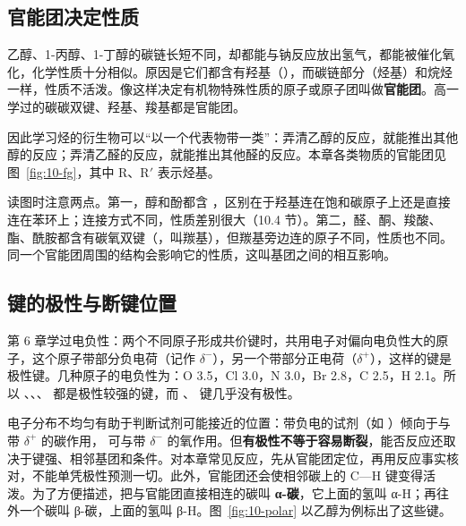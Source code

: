 \subsection{官能团决定性质}
乙醇、1-丙醇、1-丁醇的碳链长短不同，却都能与钠反应放出氢气，都能被催化氧化，化学性质十分相似。原因是它们都含有羟基（），而碳链部分（烃基）和烷烃一样，性质不活泼。像这样决定有机物特殊性质的原子或原子团叫做\textbf{官能团}。高一学过的碳碳双键、羟基、羧基都是官能团。

因此学习烃的衍生物可以“以一个代表物带一类”：弄清乙醇的反应，就能推出其他醇的反应；弄清乙醛的反应，就能推出其他醛的反应。本章各类物质的官能团见图~\ref{fig:10-fg}，其中 R、R$'$ 表示烃基。


读图时注意两点。第一，醇和酚都含 ，区别在于羟基连在饱和碳原子上还是直接连在苯环上；连接方式不同，性质差别很大（10.4 节）。第二，醛、酮、羧酸、酯、酰胺都含有碳氧双键（，叫羰基），但羰基旁边连的原子不同，性质也不同。同一个官能团周围的结构会影响它的性质，这叫基团之间的相互影响。

\subsection{键的极性与断键位置}
第 6 章学过电负性：两个不同原子形成共价键时，共用电子对偏向电负性大的原子，这个原子带部分负电荷（记作 $\delta^-$），另一个带部分正电荷（$\delta^+$），这样的键是极性键。几种原子的电负性为：O 3.5，Cl 3.0，N 3.0，Br 2.8，C 2.5，H 2.1。所以 、、、 都是极性较强的键，而 、 键几乎没有极性。

电子分布不均匀有助于判断试剂可能接近的位置：带负电的试剂（如 ）倾向于与带 $\delta^+$ 的碳作用， 可与带 $\delta^-$ 的氧作用。但\textbf{有极性不等于容易断裂}，能否反应还取决于键强、相邻基团和条件。对本章常见反应，先从官能团定位，再用反应事实核对，不能单凭极性预测一切。此外，官能团还会使相邻碳上的 C—H 键变得活泼。为了方便描述，把与官能团直接相连的碳叫 \textbf{α-碳}，它上面的氢叫 α-H；再往外一个碳叫 β-碳，上面的氢叫 β-H。图~\ref{fig:10-polar} 以乙醇为例标出了这些键。

